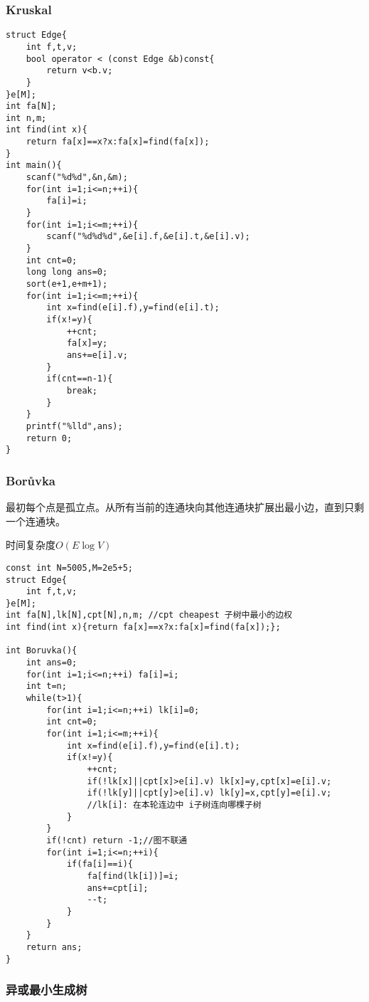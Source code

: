 \documentclass[UTF8]{ctexart}
\begin{document}
\subsubsection{Kruskal}
\begin{lstlisting}
struct Edge{
    int f,t,v;
    bool operator < (const Edge &b)const{
        return v<b.v;
    }
}e[M];
int fa[N];
int n,m;
int find(int x){
    return fa[x]==x?x:fa[x]=find(fa[x]); 
}
int main(){
    scanf("%d%d",&n,&m);
    for(int i=1;i<=n;++i){ 
        fa[i]=i;
    } 
    for(int i=1;i<=m;++i){
        scanf("%d%d%d",&e[i].f,&e[i].t,&e[i].v);
    }
    int cnt=0;
    long long ans=0;
    sort(e+1,e+m+1);
    for(int i=1;i<=m;++i){
        int x=find(e[i].f),y=find(e[i].t);
        if(x!=y){
            ++cnt;
            fa[x]=y;
            ans+=e[i].v;
        }
        if(cnt==n-1){
            break;
        }
    }
    printf("%lld",ans);
    return 0;
} 
\end{lstlisting}
\subsubsection{Borůvka}

最初每个点是孤立点。从所有当前的连通块向其他连通块扩展出最小边，直到只剩一个连通块。

时间复杂度$O(E\log V)$

\begin{lstlisting}
const int N=5005,M=2e5+5;
struct Edge{
    int f,t,v;
}e[M];
int fa[N],lk[N],cpt[N],n,m; //cpt cheapest 子树中最小的边权 
int find(int x){return fa[x]==x?x:fa[x]=find(fa[x]);};

int Boruvka(){
    int ans=0;
    for(int i=1;i<=n;++i) fa[i]=i;
    int t=n;
    while(t>1){
        for(int i=1;i<=n;++i) lk[i]=0;
        int cnt=0;
        for(int i=1;i<=m;++i){
            int x=find(e[i].f),y=find(e[i].t);
            if(x!=y){
                ++cnt;
                if(!lk[x]||cpt[x]>e[i].v) lk[x]=y,cpt[x]=e[i].v;
                if(!lk[y]||cpt[y]>e[i].v) lk[y]=x,cpt[y]=e[i].v;
                //lk[i]: 在本轮连边中 i子树连向哪棵子树 
            }
        }
        if(!cnt) return -1;//图不联通 
        for(int i=1;i<=n;++i){
            if(fa[i]==i){
                fa[find(lk[i])]=i;
                ans+=cpt[i];
                --t;
            }
        }
    }
    return ans;
} 
\end{lstlisting}

\subsubsection{异或最小生成树}
\end{document}
